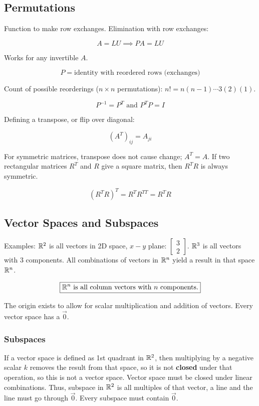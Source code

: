 \subsection{Permutations}

Function to make row exchanges. Elimination with row exchanges:

\[A=LU\implies PA=LU\]

Works for any invertible $A$.

\[P=\text{identity with reordered rows (exchanges)}\]

Count of possible reorderings ($n\times n$ permutations): $n! = n(n-1)\cdots 3(2)(1)$.

\[\boxed{P^{-1}=P^T\text{ and }P^TP=I}\]

Defining a transpose, or flip over diagonal:

\[(A^T)_{ij}=A_{ji}\]

For symmetric matrices, transpose does not cause change; $A^T=A$. If two rectangular matrices $R^T$ and $R$
give a square matrix, then $R^TR$ is always symmetric.

\[\boxed{(R^TR)^T=R^TR^{TT}=R^TR}\]

\subsection{Vector Spaces and Subspaces}

Examples: $\mathbb{R}^2$ is all vectors in 2D space, $x-y$ plane: $\begin{bmatrix}3\\2\end{bmatrix}$.
$\mathbb{R}^3$ is all vectors with 3 components. All combinations of vectors in $\mathbb{R}^n$ yield a result in that space $\mathbb{R}^n$.

\[\boxed{\mathbb{R}^n\text{ is all column vectors with $n$ components.}}\]

The origin exists to allow for scalar multiplication and addition of vectors. Every vector space has a $\vec{0}$.

\subsubsection{Subspaces}

If a vector space is defined as 1st quadrant in $\mathbb{R}^2$, then multiplying by a negative scalar $k$ 
removes the result from that space, so it is not \textbf{closed} under that operation, so this is not a vector space. 
Vector space must be closed under linear combinations. Thus, subspace in $\mathbb{R}^2$ is all multiples of that vector, a line and the line must go through $\vec{0}$.
Every subspace must contain $\vec{0}$.\newline

